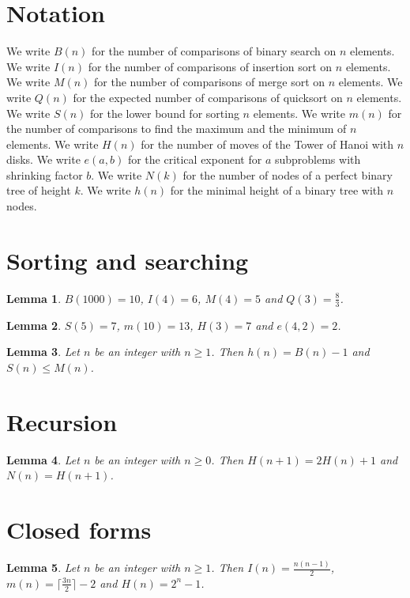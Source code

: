 \documentclass{article}
\newtheorem{lemma}{Lemma}
\begin{document}
\section{Notation}

We write $B(n)$ for the number of comparisons of binary search on $n$ elements.
We write $I(n)$ for the number of comparisons of insertion sort on $n$ elements.
We write $M(n)$ for the number of comparisons of merge sort on $n$ elements.
We write $Q(n)$ for the expected number of comparisons of quicksort on $n$ elements.
We write $S(n)$ for the lower bound for sorting $n$ elements.
We write $m(n)$ for the number of comparisons to find the maximum and the minimum of $n$ elements.
We write $H(n)$ for the number of moves of the Tower of Hanoi with $n$ disks.
We write $e(a,b)$ for the critical exponent for $a$ subproblems with shrinking factor $b$.
We write $N(k)$ for the number of nodes of a perfect binary tree of height $k$.
We write $h(n)$ for the minimal height of a binary tree with $n$ nodes.

\section{Sorting and searching}

\begin{lemma}\label{values}
$B(1000)=10$, $I(4)=6$, $M(4)=5$ and $Q(3)=\frac83$.
\end{lemma}

\begin{lemma}\label{bounds}
$S(5)=7$, $m(10)=13$, $H(3)=7$ and $e(4,2)=2$.
\end{lemma}

\begin{lemma}\label{lower}
Let $n$ be an integer with $n\ge1$. Then $h(n)=B(n)-1$ and $S(n)\le M(n)$.
\end{lemma}

\section{Recursion}

\begin{lemma}\label{hanoi}
Let $n$ be an integer with $n\ge0$. Then $H(n+1)=2H(n)+1$ and $N(n)=H(n+1)$.
\end{lemma}

\section{Closed forms}

\begin{lemma}\label{closed}
Let $n$ be an integer with $n\ge1$. Then $I(n)=\frac{n(n-1)}{2}$, $m(n)=\lceil\frac{3n}{2}\rceil-2$ and $H(n)=2^n-1$.
\end{lemma}
\end{document}
